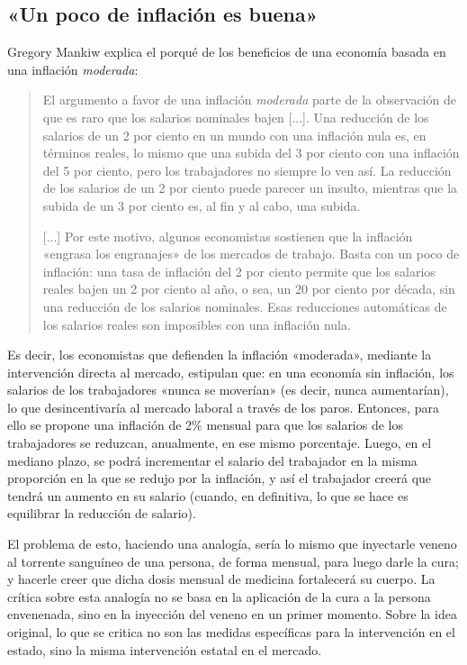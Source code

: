 \documentclass[12pt,a4paper,twoside]{book}
\begin{document}
\subsection{«Un poco de inflación es buena»}
Gregory Mankiw explica el porqué de los beneficios de una economía basada en una inflación \textit{moderada}:

\begin{quotation}
El argumento a favor de una inflación \textit{moderada} parte de la observación de que es raro que los salarios nominales bajen [...]. Una reducción de los salarios de un 2 por ciento en un mundo con una inflación nula es, en términos reales, lo mismo que una subida del 3 por ciento con una inflación del 5 por ciento, pero los trabajadores no siempre lo ven así. La reducción de los salarios de un 2 por ciento puede parecer un insulto, mientras que la subida de un 3 por ciento es, al fin y al cabo, una subida.

[...] Por este motivo, algunos economistas sostienen que la inflación «engrasa los engranajes» de los mercados de trabajo. Basta con un poco de inflación: una tasa de inflación del 2 por ciento permite que los salarios reales bajen un 2 por ciento al año, o sea, un 20 por ciento por década, sin una reducción de los salarios nominales. Esas reducciones automáticas de los salarios reales son imposibles con una inflación nula. \cite[págs. 198-199]{mankiw}
\end{quotation}

Es decir, los economistas que defienden la inflación «moderada», mediante la intervención directa al mercado, estipulan que: en una economía sin inflación, los salarios de los trabajadores «nunca se moverían» (es decir, nunca aumentarían), lo que desincentivaría al mercado laboral a través de los paros. Entonces, para ello se propone una inflación de 2\% mensual para que los salarios de los trabajadores se reduzcan, anualmente, en ese mismo porcentaje. Luego, en el mediano plazo, se podrá incrementar el salario del trabajador en la misma proporción en la que se redujo por la inflación, y así el trabajador creerá que tendrá un aumento en su salario (cuando, en definitiva, lo que se hace es equilibrar la reducción de salario).

El problema de esto, haciendo una analogía, sería lo mismo que inyectarle veneno al torrente sanguíneo de una persona, de forma mensual, para luego darle la cura; y hacerle creer que dicha dosis mensual de medicina fortalecerá su cuerpo. La crítica sobre esta analogía no se basa en la aplicación de la cura a la persona envenenada, sino en la inyección del veneno en un primer momento. Sobre la idea original, lo que se critica no son las medidas específicas para la intervención en el estado, sino la misma intervención estatal en el mercado. 
\end{document}
